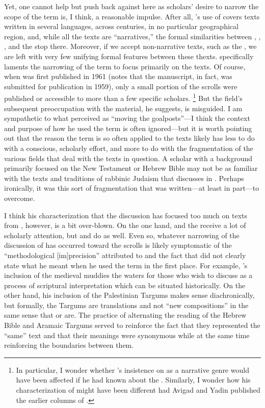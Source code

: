 Yet, one cannot help but push back against \vermes here as scholars' desire to narrow the scope of the term is, I think, a reasonable impulse. After all, \vermes's use of \rwb covers texts written in several languages, across centuries, in no particular geographical region, and, while all the texts are ``narratives,'' the formal similarities between \ga, \ant, \jub, and the \pTarg stop there. Moreover, if we accept non-narrative texts, such as the \templescroll, we are left with very few unifying formal features between these thexts. \vermes specifically laments the narrowing of the term \rwb to focus primarily on the \dss texts. Of course, when  was first published in 1961 (\vermes notes that the manuscript, in fact, was submitted for publication in 1959), only a small portion of the scrolls were published or accessible to more than a few specific scholars.%
    \footnote{%
        In particular, I wonder whether \vermes's insistence on \rwb as a narrative genre would have been affected if he had known about the \templescroll. Similarly, I wonder how his characterization of \ga might have been different had Avigad and Yadin published the earlier columns of \ga.}
But the field's subsequent preoccupation with the \qumran material, he suggests, is misguided. I am sympathetic to what \vermes perceived as ``moving the goalposts''---I think the context and purpose of how he used the term \rwb is often ignored---but it is worth pointing out that the reason the term \rwb is so often applied to the \qumran texts likely has less to do with a conscious, scholarly effort, and more to do with the fragmentation of the various fields that deal with the texts in question. A scholar with a background primarily focused on the New Testament or Hebrew Bible may not be as familiar with the texts and traditions of rabbinic Judaism that \vermes discusses in . Perhaps ironically, it was this sort of fragmentation that  was written---at least in part---to overcome.

I think his characterization that the discussion has focused too much on texts from \qumran, however, is a bit over-blown. On the one hand, \ga and the \templescroll receive a lot of scholarly attention, but \jub and \ant do as well. Even so, whatever narrowing of the discussion of \rwb has occurred toward the \qumran scrolls is likely symptomatic of the ``methodological [im]precision'' attributed to  and the fact that \vermes did not clearly state what he meant when he used the term \rwb in the first place. For example, \vermes's inclusion of the medieval \sefer muddies the waters for those who wish to discuss \rwb as a process of scriptural interpretation which can be situated historically. On the other hand, his inclusion of the Palestinian Targums makes sense diachronically, but formally, the Targums are translations and not ``new compositions'' in the same sense that \jub or \ga are. The practice of alternating the reading of the Hebrew Bible and Aramaic Targums served to reinforce the fact that they represented the ``same'' text and that their meanings were synonymous while at the same time reinforcing the boundaries between them.

